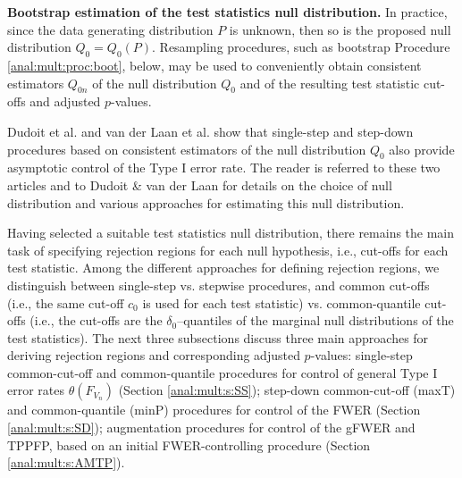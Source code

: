 \documentclass[11pt]{article}
\begin{document}
\noindent
{\bf Bootstrap estimation of the test statistics null distribution.}
In practice, since the data generating distribution $P$ is unknown, then so is the proposed null distribution $Q_0=Q_0(P)$.  Resampling procedures, such as bootstrap Procedure \ref{anal:mult:proc:boot}, below, may be used to conveniently obtain consistent estimators $Q_{0n}$ of the null distribution $Q_0$ and of the resulting test statistic cut-offs and adjusted $p$-values. 

Dudoit et al. \cite{DudoitetalMT1SAGMB04} and van der Laan et al. \cite{vdLaanetalMT2SAGMB04} show that single-step and step-down procedures based on consistent estimators of the null distribution $Q_0$ also provide asymptotic control of the Type I error rate. The reader is referred to these two articles and to Dudoit \& van der Laan \cite{Dudoit&vdLaanMTBook} for details on the choice of null distribution and various approaches for estimating this null distribution.

Having selected a suitable test statistics null distribution, there remains the main task of specifying rejection regions for each null hypothesis, i.e., cut-offs for each test statistic. 
Among the different approaches for defining rejection regions, we distinguish between single-step vs. stepwise procedures, and common cut-offs (i.e., the same cut-off $c_0$ is used for each test statistic) vs. common-quantile cut-offs (i.e., the cut-offs are the $\delta_0$--quantiles of the marginal null distributions of the test statistics). 
The next three subsections discuss three main approaches for deriving rejection regions and corresponding adjusted $p$-values: single-step common-cut-off and common-quantile procedures for control of general Type I error rates $\theta(F_{V_n})$ (Section \ref{anal:mult:s:SS});  step-down  common-cut-off (maxT) and common-quantile (minP) procedures for control of the FWER (Section \ref{anal:mult:s:SD}); augmentation procedures for control of the gFWER and TPPFP, based on an initial FWER-controlling procedure (Section \ref{anal:mult:s:AMTP}).
\end{document}
